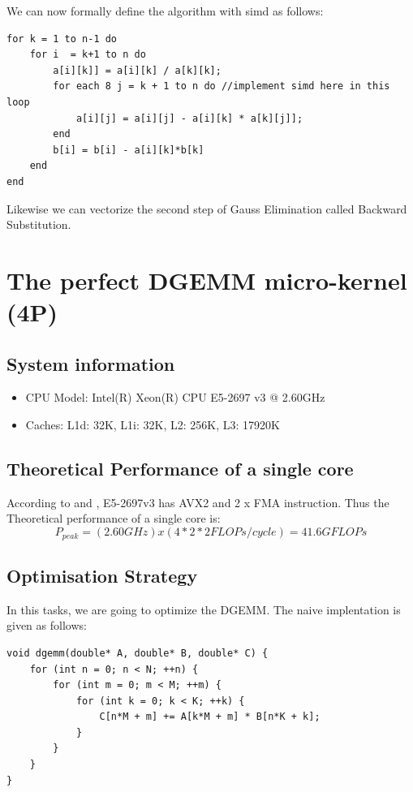 \documentclass[article]{scrartcl}
\begin{document}
We can now formally define the algorithm with simd as follows:
\begin{lstlisting}[frame=single]
for k = 1 to n-1 do
    for i  = k+1 to n do
        a[i][k]] = a[i][k] / a[k][k];
        for each 8 j = k + 1 to n do //implement simd here in this loop
            a[i][j] = a[i][j] - a[i][k] * a[k][j]];
        end
        b[i] = b[i] - a[i][k]*b[k]
    end
end    
\end{lstlisting}
Likewise we can vectorize the second step of Gauss Elimination called Backward Substitution.

\section{ The perfect DGEMM micro-kernel (4P)}
\subsection{System information}
\begin{itemize}
  \item CPU Model: Intel(R) Xeon(R) CPU E5-2697 v3 @ 2.60GHz
  \item Caches: L1d: 32K, L1i: 32K, L2: 256K, L3: 17920K
\end{itemize}


\subsection{Theoretical Performance of a single core}
According to \cite{haswell16} and \cite{haswell}, E5-2697v3 has AVX2 and 2 x FMA instruction. Thus the Theoretical performance of a single core is: \\
$$ P_{peak} = (2.60 GHz) x (4*2*2  FLOPs/cycle) = 41.6 GFLOPs $$

\subsection{Optimisation Strategy}

In this tasks, we are going to optimize the DGEMM. The naive implentation is given as follows:
\begin{lstlisting}[frame=single]
void dgemm(double* A, double* B, double* C) {
    for (int n = 0; n < N; ++n) {
        for (int m = 0; m < M; ++m) {
            for (int k = 0; k < K; ++k) {
                C[n*M + m] += A[k*M + m] * B[n*K + k];
            }
        }
    }
}
\end{lstlisting}
\end{document}
